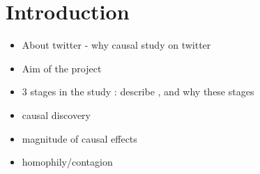 \section{Introduction}
\label{sec:introduction}
\begin{itemize}
\item About twitter - why causal study on twitter
\item Aim of the project
\item 3 stages in the study : describe , and why these stages
\item causal discovery
\item magnitude of causal effects
\item homophily/contagion 
\end{itemize}